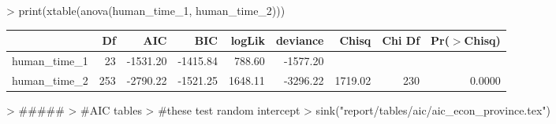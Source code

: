 
>   print(xtable(anova(human_time_1, human_time_2)))
\begin{table}[ht]
\centering
\begin{tabular}{lrrrrrrrr}
  \hline
 & Df & AIC & BIC & logLik & deviance & Chisq & Chi Df & Pr($>$Chisq) \\ 
  \hline
human\_time\_1 & 23 & -1531.20 & -1415.84 & 788.60 & -1577.20 &  &  &  \\ 
  human\_time\_2 & 253 & -2790.22 & -1521.25 & 1648.11 & -3296.22 & 1719.02 & 230 & 0.0000 \\ 
   \hline
\end{tabular}
\end{table}

> #####
> #AIC tables
> #these test random intercept
> sink("report/tables/aic/aic_econ_province.tex")
